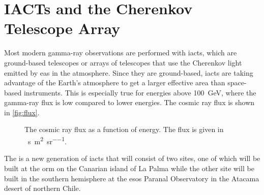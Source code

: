 \chapter{IACTs and the Cherenkov Telescope Array}

Most modern gamma-ray observations are performed with \glspl{iact}, which are ground-based telescopes
or arrays of telescopes that use the Cherenkov light emitted by \gls{eas} in the atmosphere.
Since they are ground-based, \glspl{iact} are taking advantage of the Earth's atmosphere to get a larger
effective area than space-based instruments. This is especially true for energies above \SI{100}{\giga\eV},
 where the gamma-ray flux is low compared to lower energies. The cosmic ray flux
is shown in \autoref{fig:flux}.

\begin{figure}
    \centering
    
    \caption{The cosmic ray flux as a function of energy. The flux is given in \si{\per\second\per\square\meter\per\steradian}.}
    \label{fig:flux}
\end{figure}

The \cta{} is a new generation of \glspl{iact} that will consist of two sites,
one of which will be built at the \gls{orm} on the Canarian island of La Palma while the other site
will be built in the southern hemisphere at the \glspl{eso} Paranal Observatory in the Atacama desert
of northern Chile.
